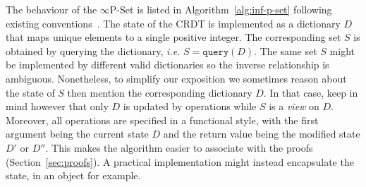 \documentclass[10pt, oneside]{article}   	%
\begin{document}
The behaviour of the $\infty$P-Set is listed in Algorithm~\ref{alg:inf-p-set} following existing conventions~\cite{shapiro:inria-00555588}.  The state of the CRDT is implemented as a dictionary $D$ that 
maps unique elements to a single positive integer. The corresponding set $S$ is obtained by querying the dictionary, \textit{i.e.} $S=\texttt{query}(D)$. The same set $S$ might be implemented by different valid dictionaries so the inverse relationship is ambiguous. Nonetheless, to simplify our exposition we sometimes reason about the state of $S$ then mention the corresponding dictionary $D$. In that case, keep in mind however that only $D$ is updated by operations while $S$ is a \textit{view} on $D$. Moreover, all operations are specified in a functional style, with the first argument being the current state $D$ and the return value being the modified state $D'$ or $D''$. This makes the algorithm easier to associate with the proofs (Section~\ref{sec:proofs}). A practical implementation might instead encapsulate the state, in an object for example.
\end{document}
